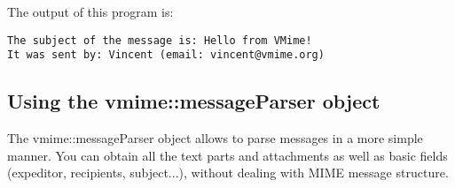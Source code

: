 The output of this program is:

\begin{verbatim}
The subject of the message is: Hello from VMime!
It was sent by: Vincent (email: vincent@vmime.org)
\end{verbatim}


\subsection{Using the {\vcode vmime::messageParser} object} %

The {\vcode vmime::messageParser} object allows to parse messages in a more
simple manner. You can obtain all the text parts and attachments as well as
basic fields (expeditor, recipients, subject...), without dealing with
MIME message structure.

